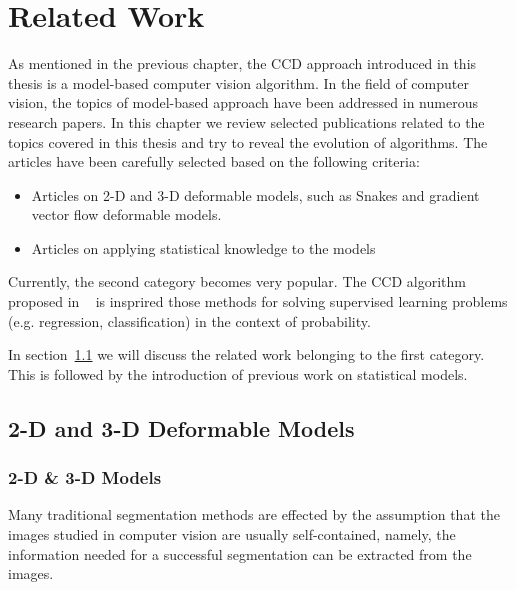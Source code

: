\chapter{Related Work}
\label{chapter:related}

As mentioned in the previous chapter, the
CCD approach introduced in this thesis is a model-based computer
vision algorithm. In the field of
computer vision, the topics of model-based approach have been addressed in numerous research papers.
In this chapter we review selected publications related to the topics
covered in this thesis and try to reveal the evolution of algorithms. The
articles have been carefully selected based on the following criteria:
\begin{itemize}
\item Articles on 2-D and 3-D deformable models,
  such as Snakes and gradient vector flow deformable models.
\item Articles on applying statistical knowledge to the models
\end{itemize}
Currently, the second category becomes very popular. The CCD algorithm proposed in
~\cite{hanek2004contracting} is insprired those methods for solving
supervised learning problems (e.g. regression, classification) in
the context of probability.

In section~\ref{sec:2d3ddm} we will discuss the related work
belonging to the first category. This is followed by the introduction
of previous work on statistical models.

\section{2-D and 3-D Deformable Models}
\label{sec:2d3ddm}

\subsection{2-D \& 3-D Models}
\label{sec:23m}
Many traditional segmentation methods are effected by the assumption that the
images studied in computer vision are usually self-contained, namely,
the information needed for a successful segmentation can be extracted
from the images.

